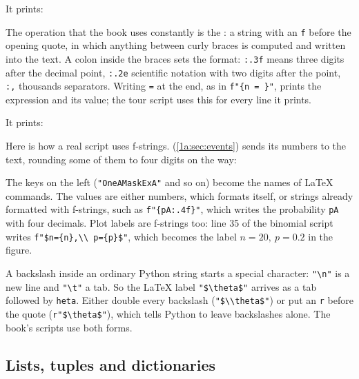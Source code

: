 \noindent It prints:

The operation that the book uses constantly is the : a string with an \texttt{f} before the opening quote, in which anything between curly braces is computed and written into the text. A colon inside the braces sets the format: \texttt{:.3f} means three digits after the decimal point, \texttt{:.2e} scientific notation with two digits after the point, \texttt{:,} thousands separators. Writing \texttt{=} at the end, as in \verb|f"{n = }"|, prints the expression and its value; the tour script uses this for every line it prints.

\noindent It prints:

Here is how a real script uses f-strings.  (\cref{1a:sec:events}) sends its numbers to the text, rounding some of them to four digits on the way:


The keys on the left (\texttt{"OneAMaskExA"} and so on) become the names of \LaTeX{} commands. The values are either numbers, which  formats itself, or strings already formatted with f-strings, such as \verb|f"{pA:.4f}"|, which writes the probability \texttt{pA} with four decimals. Plot labels are f-strings too: line 35 of the binomial script writes \verb|f"$n={n},\\ p={p}$"|, which becomes the label $n=20,\ p=0.2$ in the figure.

\begin{pitfall}
A backslash inside an ordinary Python string starts a special character: \verb|"\n"| is a new line and \verb|"\t"| a tab. So the \LaTeX{} label \verb|"$\theta$"| arrives as a tab followed by \texttt{heta}. Either double every backslash (\verb|"$\\theta$"|) or put an \texttt{r} before the quote (\verb|r"$\theta$"|), which tells Python to leave backslashes alone. The book's scripts use both forms.
\end{pitfall}

\subsection{Lists, tuples and dictionaries}
\label{T0a:sec:containers}

